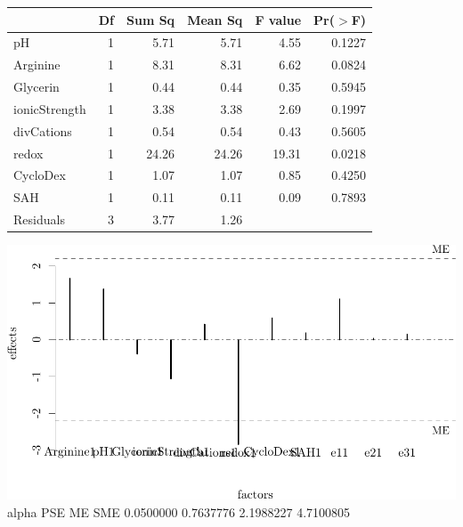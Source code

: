 \documentclass[]{article}
\begin{document}
\begin{table}[ht]
\centering
\begin{tabular}{lrrrrr}
  \hline
 & Df & Sum Sq & Mean Sq & F value & Pr($>$F) \\ 
  \hline
pH            & 1 & 5.71 & 5.71 & 4.55 & 0.1227 \\ 
  Arginine      & 1 & 8.31 & 8.31 & 6.62 & 0.0824 \\ 
  Glycerin      & 1 & 0.44 & 0.44 & 0.35 & 0.5945 \\ 
  ionicStrength & 1 & 3.38 & 3.38 & 2.69 & 0.1997 \\ 
  divCations    & 1 & 0.54 & 0.54 & 0.43 & 0.5605 \\ 
  redox         & 1 & 24.26 & 24.26 & 19.31 & 0.0218 \\ 
  CycloDex      & 1 & 1.07 & 1.07 & 0.85 & 0.4250 \\ 
  SAH           & 1 & 0.11 & 0.11 & 0.09 & 0.7893 \\ 
  Residuals     & 3 & 3.77 & 1.26 &  &  \\ 
   \hline
\end{tabular}
\end{table}

\includegraphics{analysis_files/figure-latex/unnamed-chunk-14-1.pdf}
alpha PSE ME SME 0.0500000 0.7637776 2.1988227 4.7100805
\end{document}
